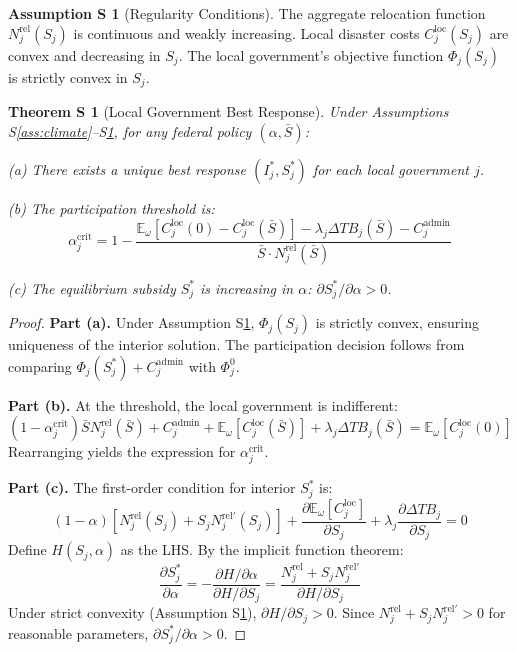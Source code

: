 \documentclass[11pt,letterpaper]{article}
\newtheorem{theoremS}{Theorem S}
\theoremstyle{definition}
\newtheorem{assumptionS}{Assumption S}
\newcommand{\E}{\mathbb{E}}
\begin{document}
\begin{assumptionS}[Regularity Conditions]\label{ass:regularity}
The aggregate relocation function $N_j^{\text{rel}}(S_j)$ is continuous and weakly increasing. Local disaster costs $C_j^{\text{loc}}(S_j)$ are convex and decreasing in $S_j$. The local government's objective function $\Phi_j(S_j)$ is strictly convex in $S_j$.
\end{assumptionS}

\begin{theoremS}[Local Government Best Response]\label{thm:local}
Under Assumptions S\ref{ass:climate}--S\ref{ass:regularity}, for any federal policy $(\alpha, \bar{S})$:

(a) There exists a unique best response $(I_j^*, S_j^*)$ for each local government $j$.

(b) The participation threshold is:
\begin{equation}
\alpha_j^{\text{crit}} = 1 - \frac{\E_\omega[C_j^{\text{loc}}(0) - C_j^{\text{loc}}(\bar{S})] - \lambda_j \Delta TB_j(\bar{S}) - C_j^{\text{admin}}}{\bar{S} \cdot N_j^{\text{rel}}(\bar{S})}
\end{equation}

(c) The equilibrium subsidy $S_j^*$ is increasing in $\alpha$: $\partial S_j^* / \partial \alpha > 0$.
\end{theoremS}

\begin{proof}
\textbf{Part (a).} Under Assumption S\ref{ass:regularity}, $\Phi_j(S_j)$ is strictly convex, ensuring uniqueness of the interior solution. The participation decision follows from comparing $\Phi_j(S_j^*) + C_j^{\text{admin}}$ with $\Phi_j^0$.

\textbf{Part (b).} At the threshold, the local government is indifferent:
\begin{equation}
(1-\alpha_j^{\text{crit}})\bar{S} N_j^{\text{rel}}(\bar{S}) + C_j^{\text{admin}} + \E_\omega[C_j^{\text{loc}}(\bar{S})] + \lambda_j \Delta TB_j(\bar{S}) = \E_\omega[C_j^{\text{loc}}(0)]
\end{equation}
Rearranging yields the expression for $\alpha_j^{\text{crit}}$.

\textbf{Part (c).} The first-order condition for interior $S_j^*$ is:
\begin{equation}
(1-\alpha)[N_j^{\text{rel}}(S_j) + S_j N_j^{\text{rel}\prime}(S_j)] + \frac{\partial \E_\omega[C_j^{\text{loc}}]}{\partial S_j} + \lambda_j \frac{\partial \Delta TB_j}{\partial S_j} = 0
\end{equation}
Define $H(S_j, \alpha)$ as the LHS. By the implicit function theorem:
\begin{equation}
\frac{\partial S_j^*}{\partial \alpha} = -\frac{\partial H / \partial \alpha}{\partial H / \partial S_j} = \frac{N_j^{\text{rel}} + S_j N_j^{\text{rel}\prime}}{\partial H / \partial S_j}
\end{equation}
Under strict convexity (Assumption S\ref{ass:regularity}), $\partial H / \partial S_j > 0$. Since $N_j^{\text{rel}} + S_j N_j^{\text{rel}\prime} > 0$ for reasonable parameters, $\partial S_j^* / \partial \alpha > 0$.
\end{proof}
\end{document}
